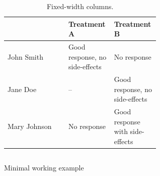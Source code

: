 \begin{table}[ht]
\centering
\caption{Fixed-width columns.}%
\label{tab:example}
\begin{tabular}[t]{l>{\raggedright}p{0.3\linewidth}>{\raggedright\arraybackslash}p{0.3\linewidth}}
\toprule
&Treatment A&Treatment B\\
\midrule
John Smith&Good response, no side-effects&No response\\
Jane Doe&--&Good response, no side-effects\\
Mary Johnson&No response&Good response with side-effects\\
\bottomrule
\end{tabular}
\end{table}%



\begin{listing}[ht]
\inputminted{python}{code/example.py}
\caption{Minimal working example}
\label{listing:1}
\end{listing}



